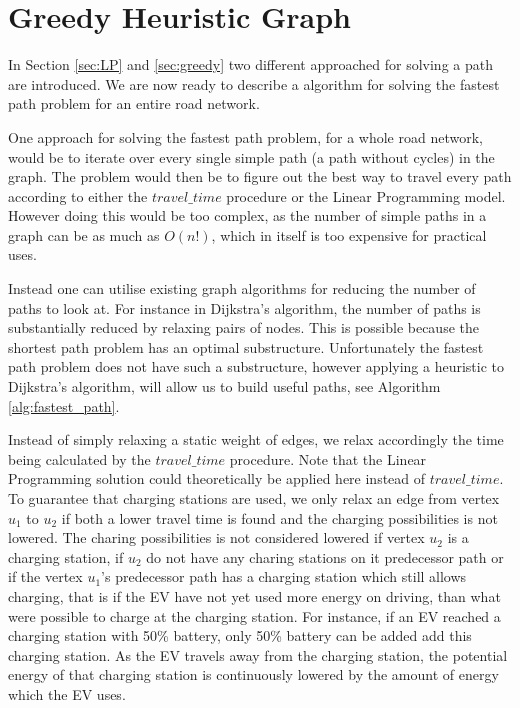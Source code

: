 \section{Greedy Heuristic Graph}\label{sec:algo}
In Section \ref{sec:LP} and \ref{sec:greedy} two different approached for solving a path are introduced. We are now ready to describe a algorithm for solving the fastest path problem for an entire road network. 

One approach for solving the fastest path problem, for a whole road network, would be to iterate over every single simple path (a path without cycles) in the graph. The problem would then be to figure out the best way to travel every path according to either the $travel\_time$ procedure or the Linear Programming model. However doing this would be too complex, as the number of simple paths in a graph can be as much as $O(n!)$, which in itself is too expensive for practical uses.

Instead one can utilise existing graph algorithms for reducing the number of paths to look at. For instance in Dijkstra's algorithm, the number of paths is substantially reduced by relaxing pairs of nodes. This is possible because the shortest path problem has an optimal substructure. Unfortunately the fastest path problem does not have such a substructure, however applying a heuristic to Dijkstra's algorithm, will allow us to build useful paths, see Algorithm \ref{alg:fastest_path}.   

Instead of simply relaxing a static weight of edges, we relax accordingly the time being calculated by the $travel\_time$ procedure. Note that the Linear Programming solution could theoretically be applied here instead of $travel\_time$. To guarantee that charging stations are used, we only relax an edge from vertex $u_1$ to $u_2$ if both a lower travel time is found and the charging possibilities is not lowered. The charing possibilities is not considered lowered if vertex $u_2$ is a charging station, if $u_2$ do not have any charing stations on it predecessor path or if the vertex $u_1$'s predecessor path has a charging station which still allows charging, that is if the EV have not yet used more energy on driving, than what were possible to charge at the charging station. For instance, if an EV reached a charging station with 50\% battery, only 50\% battery can be added add this charging station. As the EV travels away from the charging station, the potential energy  of that charging station is continuously lowered by the amount of energy which the EV uses. 

